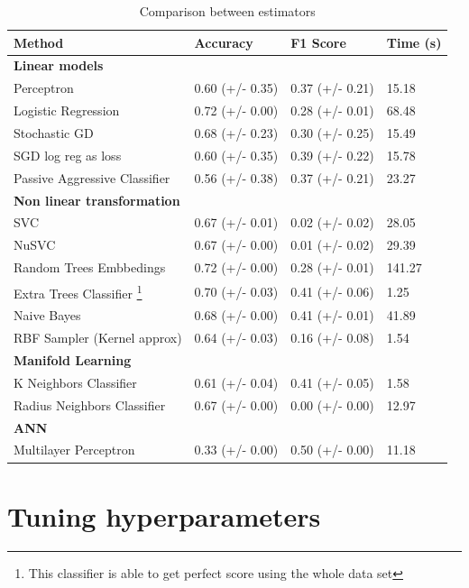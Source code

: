 \documentclass[a4paper]{article}
\begin{document}
\begin{table}[]
\centering
\caption{Comparison between estimators}
\label{tab:estimators}
\begin{tabular}{llll}
\hline
\multicolumn{1}{l}{\textbf{Method}} & \multicolumn{1}{l}{\textbf{Accuracy}} & \multicolumn{1}{l}{\textbf{F1 Score}} & \multicolumn{1}{l}{\textbf{Time (s)}} \\ \hline
\textbf{Linear models} & & & \\ \hline
Perceptron & 0.60 (+/- 0.35) & 0.37 (+/- 0.21) & 15.18  \\
Logistic Regression & 0.72 (+/- 0.00) & 0.28 (+/- 0.01) & 68.48 \\
Stochastic GD & 0.68 (+/- 0.23) & 0.30 (+/- 0.25) & 15.49 \\
SGD log reg as loss & 0.60 (+/- 0.35) & 0.39 (+/- 0.22) & 15.78 \\
Passive Aggressive Classifier & 0.56 (+/- 0.38) & 0.37 (+/- 0.21) & 23.27 \\
\textbf{Non linear transformation} & & & \\ \hline
SVC & 0.67 (+/- 0.01) & 0.02 (+/- 0.02) & 28.05 \\
NuSVC & 0.67 (+/- 0.00) & 0.01 (+/- 0.02) & 29.39 \\
Random Trees Embbedings & 0.72 (+/- 0.00) & 0.28 (+/- 0.01) & 141.27 \\
Extra Trees Classifier \footnote{This classifier is able to
get perfect score using the whole data set}
& 0.70 (+/- 0.03) & 0.41 (+/- 0.06) & 1.25 \\
Naive Bayes & 0.68 (+/- 0.00) & 0.41 (+/- 0.01) & 41.89 \\
RBF Sampler (Kernel approx) & 0.64 (+/- 0.03) & 0.16 (+/- 0.08)
& 1.54 \\
\textbf{Manifold Learning} & & & \\ \hline
K Neighbors Classifier & 0.61 (+/- 0.04) & 0.41 (+/- 0.05) & 1.58 \\
Radius Neighbors Classifier & 0.67 (+/- 0.00) & 0.00 (+/- 0.00) & 12.97 \\
\textbf{ANN} & & & \\ \hline
Multilayer Perceptron & 0.33 (+/- 0.00) & 0.50 (+/- 0.00) & 11.18 \\
\end{tabular}
\end{table}

\section{Tuning hyperparameters}
\end{document}
